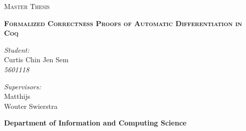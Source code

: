 \begin{titlepage}

  \begin{figure}
    \begin{minipage}{0.48\textwidth}
    \begin{flushleft}
    \end{flushleft}
    \end{minipage}\hfill
    \begin{minipage}{0.48\textwidth}
    \begin{flushright}
    \end{flushright}
    \end{minipage}
  \end{figure}

  \thispagestyle{fancy}

  \vspace{1in}

  \center

  \textsc{\large Master Thesis}

  \vspace{0.5in}

  \noindent\makebox[\linewidth]{\rule{\linewidth}{1.2pt}}
  \textsc{\textbf{\large Formalized Correctness Proofs of Automatic Differentiation in Coq}}
  \noindent\makebox[\linewidth]{\rule{\linewidth}{1.2pt}}

  \vspace{0.5in}

  \begin{minipage}{0.48\textwidth}
    \begin{flushleft}
      \textit{Student:} \\
      Curtis Chin Jen Sem \\
      \textit{5601118}
    \end{flushleft}
  \end{minipage}
  \begin{minipage}{0.48\textwidth}
    \begin{flushright}
    \textit{Supervisors:} \\
    Matthijs \Vakar \\
    Wouter Swierstra \\
    \end{flushright}
  \end{minipage}

  \vspace{2in}

  \textbf{\large Department of Information and Computing Science} \\
\end{titlepage}
